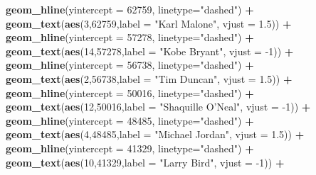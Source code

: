 \documentclass[]{book}
\newenvironment{Shaded}{\begin{snugshade}}{\end{snugshade}}
\newcommand{\DataTypeTok}[1]{\textcolor[rgb]{0.13,0.29,0.53}{#1}}
\newcommand{\DecValTok}[1]{\textcolor[rgb]{0.00,0.00,0.81}{#1}}
\newcommand{\FloatTok}[1]{\textcolor[rgb]{0.00,0.00,0.81}{#1}}
\newcommand{\KeywordTok}[1]{\textcolor[rgb]{0.13,0.29,0.53}{\textbf{#1}}}
\newcommand{\NormalTok}[1]{#1}
\newcommand{\OperatorTok}[1]{\textcolor[rgb]{0.81,0.36,0.00}{\textbf{#1}}}
\newcommand{\StringTok}[1]{\textcolor[rgb]{0.31,0.60,0.02}{#1}}
\begin{document}
\begin{Shaded}
\begin{Highlighting}[]
{{\StringTok{  }\KeywordTok{geom_hline}\NormalTok{(}\DataTypeTok{yintercept =} \DecValTok{62759}\NormalTok{, }\DataTypeTok{linetype=}\StringTok{"dashed"}\NormalTok{) }\OperatorTok{+}\StringTok{ }
\StringTok{  }\KeywordTok{geom_text}\NormalTok{(}\KeywordTok{aes}\NormalTok{(}\DecValTok{3}\NormalTok{,}\DecValTok{62759}\NormalTok{,}\DataTypeTok{label =} \StringTok{"Karl Malone"}\NormalTok{, }\DataTypeTok{vjust =} \FloatTok{1.5}\NormalTok{)) }\OperatorTok{+}\StringTok{ }
\StringTok{  }\KeywordTok{geom_hline}\NormalTok{(}\DataTypeTok{yintercept =} \DecValTok{57278}\NormalTok{, }\DataTypeTok{linetype=}\StringTok{"dashed"}\NormalTok{) }\OperatorTok{+}\StringTok{ }
\StringTok{  }\KeywordTok{geom_text}\NormalTok{(}\KeywordTok{aes}\NormalTok{(}\DecValTok{14}\NormalTok{,}\DecValTok{57278}\NormalTok{,}\DataTypeTok{label =} \StringTok{"Kobe Bryant"}\NormalTok{, }\DataTypeTok{vjust =} \DecValTok{-1}\NormalTok{)) }\OperatorTok{+}
\StringTok{  }\KeywordTok{geom_hline}\NormalTok{(}\DataTypeTok{yintercept =} \DecValTok{56738}\NormalTok{, }\DataTypeTok{linetype=}\StringTok{"dashed"}\NormalTok{) }\OperatorTok{+}\StringTok{ }
\StringTok{  }\KeywordTok{geom_text}\NormalTok{(}\KeywordTok{aes}\NormalTok{(}\DecValTok{2}\NormalTok{,}\DecValTok{56738}\NormalTok{,}\DataTypeTok{label =} \StringTok{"Tim Duncan"}\NormalTok{, }\DataTypeTok{vjust =} \FloatTok{1.5}\NormalTok{)) }\OperatorTok{+}
\StringTok{  }\KeywordTok{geom_hline}\NormalTok{(}\DataTypeTok{yintercept =} \DecValTok{50016}\NormalTok{, }\DataTypeTok{linetype=}\StringTok{"dashed"}\NormalTok{) }\OperatorTok{+}\StringTok{ }
\StringTok{  }\KeywordTok{geom_text}\NormalTok{(}\KeywordTok{aes}\NormalTok{(}\DecValTok{12}\NormalTok{,}\DecValTok{50016}\NormalTok{,}\DataTypeTok{label =} \StringTok{"Shaquille O'Neal"}\NormalTok{, }\DataTypeTok{vjust =} \DecValTok{-1}\NormalTok{)) }\OperatorTok{+}
\StringTok{  }\KeywordTok{geom_hline}\NormalTok{(}\DataTypeTok{yintercept =} \DecValTok{48485}\NormalTok{, }\DataTypeTok{linetype=}\StringTok{"dashed"}\NormalTok{) }\OperatorTok{+}\StringTok{ }
\StringTok{  }\KeywordTok{geom_text}\NormalTok{(}\KeywordTok{aes}\NormalTok{(}\DecValTok{4}\NormalTok{,}\DecValTok{48485}\NormalTok{,}\DataTypeTok{label =} \StringTok{"Michael Jordan"}\NormalTok{, }\DataTypeTok{vjust =} \FloatTok{1.5}\NormalTok{)) }\OperatorTok{+}
\StringTok{  }\KeywordTok{geom_hline}\NormalTok{(}\DataTypeTok{yintercept =} \DecValTok{41329}\NormalTok{, }\DataTypeTok{linetype=}\StringTok{"dashed"}\NormalTok{) }\OperatorTok{+}\StringTok{ }
\StringTok{  }\KeywordTok{geom_text}\NormalTok{(}\KeywordTok{aes}\NormalTok{(}\DecValTok{10}\NormalTok{,}\DecValTok{41329}\NormalTok{,}\DataTypeTok{label =} \StringTok{"Larry Bird"}\NormalTok{, }\DataTypeTok{vjust =} \DecValTok{-1}\NormalTok{)) }\OperatorTok{+}
}}
\end{Highlighting}
\end{Shaded}
\end{document}
